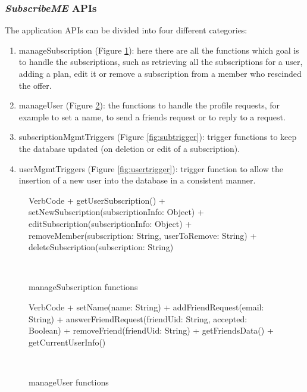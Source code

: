 \documentclass[12pt]{article}
\begin{document}
\subsubsection{\textit{SubscribeME} APIs}
The application APIs can be divided into four different categories: \begin{enumerate}
    \item manageSubscription (Figure \ref{fig:manageSub}): here there are all the functions which goal is to handle the subscriptions, such as retrieving all the subscriptions for a user, adding a plan, edit it or remove a subscription from a member who rescinded the offer.

    \item manageUser (Figure \ref{fig:manageUs}): the functions to handle the profile requests, for example to set a name, to send a friends request or to reply to a request.
    \item subscriptionMgmtTriggers (Figure \ref{fig:subtrigger}): trigger functions to keep the database updated (on deletion or edit of a subscription).
    \item userMgmtTriggers (Figure \ref{fig:usertrigger}): trigger function to allow the insertion of a new user into the database in a consistent manner.
\end{enumerate}

\begin{figure}[h!]
    \centering
    \begin{SaveVerbatim}{VerbCode}
        + getUserSubscription()
        + setNewSubscription(subscriptionInfo: Object{})
        + editSubscription(subscriptionInfo: Object{})
        + removeMember(subscription: String, userToRemove: String)
        + deleteSubscription(subscription: String)
    \end{SaveVerbatim}
    \setlength{\fboxsep}{5mm}
    \caption{manageSubscription functions}~\label{fig:manageSub}
\end{figure}

\begin{figure}[h!]
    \centering
    \begin{SaveVerbatim}{VerbCode}
        + setName(name: String)
        + addFriendRequest(email: String)
        + answerFriendRequest(friendUid: String, accepted: Boolean)
        + removeFriend(friendUid: String)
        + getFriendsData()
        + getCurrentUserInfo()
    \end{SaveVerbatim}
    \setlength{\fboxsep}{5mm}
    \caption{manageUser functions}~\label{fig:manageUs}
\end{figure}
\end{document}
